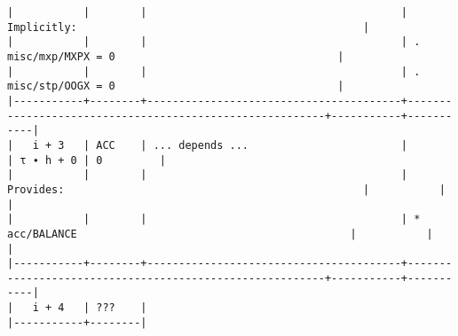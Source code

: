 \documentclass[varwidth=\maxdimen,margin=0.5cm,multi={verbatim}]{standalone}
\begin{document}
\begin{verbatim}
|           |        |                                        | Implicitly:                                             |
|           |        |                                        | .   misc/mxp/MXPX = 0                                   |
|           |        |                                        | .   misc/stp/OOGX = 0                                   |
|-----------+--------+----------------------------------------+---------------------------------------------------------+-----------+-----------|
|   i + 3   | ACC    | ... depends ...                        |                                                         | τ ∙ h + 0 | 0         |
|           |        |                                        | Provides:                                               |           |           |
|           |        |                                        | * acc/BALANCE                                           |           |           |
|-----------+--------+----------------------------------------+---------------------------------------------------------+-----------+-----------|
|   i + 4   | ???    |
|-----------+--------|

\end{verbatim}
\end{document}
